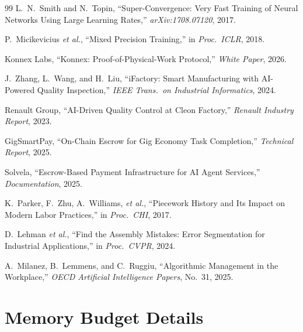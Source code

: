 \documentclass[10pt,twocolumn]{article}
\begin{document}
\begin{thebibliography}{99}
L.~N.~Smith and N.~Topin,
``Super-Convergence: Very Fast Training of Neural Networks Using Large Learning Rates,''
\emph{arXiv:1708.07120}, 2017.

P.~Micikevicius \emph{et al.},
``Mixed Precision Training,''
in \emph{Proc.\ ICLR}, 2018.

Konnex Labs,
``Konnex: Proof-of-Physical-Work Protocol,''
\emph{White Paper}, 2026.

J.~Zhang, L.~Wang, and H.~Liu,
``iFactory: Smart Manufacturing with AI-Powered Quality Inspection,''
\emph{IEEE Trans.\ on Industrial Informatics}, 2024.

Renault Group,
``AI-Driven Quality Control at Cleon Factory,''
\emph{Renault Industry Report}, 2023.

GigSmartPay,
``On-Chain Escrow for Gig Economy Task Completion,''
\emph{Technical Report}, 2025.

Solvela,
``Escrow-Based Payment Infrastructure for AI Agent Services,''
\emph{Documentation}, 2025.

K.~Parker, F.~Zhu, A.~Williams, \emph{et al.},
``Piecework History and Its Impact on Modern Labor Practices,''
in \emph{Proc.\ CHI}, 2017.

D.~Lehman \emph{et al.},
``Find the Assembly Mistakes: Error Segmentation for Industrial Applications,''
in \emph{Proc.\ CVPR}, 2024.

A.~Milanez, B.~Lemmens, and C.~Ruggiu,
``Algorithmic Management in the Workplace,''
\emph{OECD Artificial Intelligence Papers}, No.~31, 2025.

\end{thebibliography}
\FloatBarrier

\appendix

\section{Memory Budget Details}
\label{app:memory}
\end{document}
